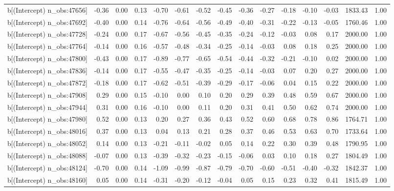 \begin{table}[ht]
\begin{tabular}{rrrrrrrrrrrrrrr}
  b[(Intercept) n\_obs:47656] & -0.36 & 0.00 & 0.13 & -0.70 & -0.61 & -0.52 & -0.45 & -0.36 & -0.27 & -0.18 & -0.10 & -0.03 & 1833.43 & 1.00 \\ 
  b[(Intercept) n\_obs:47692] & -0.40 & 0.00 & 0.14 & -0.76 & -0.64 & -0.56 & -0.49 & -0.40 & -0.31 & -0.22 & -0.13 & -0.05 & 1760.46 & 1.00 \\ 
  b[(Intercept) n\_obs:47728] & -0.24 & 0.00 & 0.17 & -0.67 & -0.56 & -0.45 & -0.35 & -0.24 & -0.12 & -0.03 & 0.08 & 0.17 & 2000.00 & 1.00 \\ 
  b[(Intercept) n\_obs:47764] & -0.14 & 0.00 & 0.16 & -0.57 & -0.48 & -0.34 & -0.25 & -0.14 & -0.03 & 0.08 & 0.18 & 0.25 & 2000.00 & 1.00 \\ 
  b[(Intercept) n\_obs:47800] & -0.43 & 0.00 & 0.17 & -0.89 & -0.77 & -0.65 & -0.54 & -0.44 & -0.32 & -0.21 & -0.10 & 0.02 & 2000.00 & 1.00 \\ 
  b[(Intercept) n\_obs:47836] & -0.14 & 0.00 & 0.17 & -0.55 & -0.47 & -0.35 & -0.25 & -0.14 & -0.03 & 0.07 & 0.20 & 0.27 & 2000.00 & 1.00 \\ 
  b[(Intercept) n\_obs:47872] & -0.18 & 0.00 & 0.17 & -0.62 & -0.51 & -0.39 & -0.29 & -0.17 & -0.06 & 0.04 & 0.15 & 0.22 & 2000.00 & 1.00 \\ 
  b[(Intercept) n\_obs:47908] & 0.29 & 0.00 & 0.15 & -0.10 & 0.00 & 0.10 & 0.20 & 0.29 & 0.39 & 0.48 & 0.59 & 0.67 & 2000.00 & 1.00 \\ 
  b[(Intercept) n\_obs:47944] & 0.31 & 0.00 & 0.16 & -0.10 & 0.00 & 0.11 & 0.20 & 0.31 & 0.41 & 0.50 & 0.62 & 0.74 & 2000.00 & 1.00 \\ 
  b[(Intercept) n\_obs:47980] & 0.52 & 0.00 & 0.13 & 0.20 & 0.27 & 0.36 & 0.43 & 0.52 & 0.60 & 0.68 & 0.78 & 0.86 & 1764.71 & 1.00 \\ 
  b[(Intercept) n\_obs:48016] & 0.37 & 0.00 & 0.13 & 0.04 & 0.13 & 0.21 & 0.28 & 0.37 & 0.46 & 0.53 & 0.63 & 0.70 & 1733.64 & 1.00 \\ 
  b[(Intercept) n\_obs:48052] & 0.14 & 0.00 & 0.13 & -0.21 & -0.11 & -0.02 & 0.05 & 0.14 & 0.22 & 0.30 & 0.39 & 0.48 & 1790.95 & 1.00 \\ 
  b[(Intercept) n\_obs:48088] & -0.07 & 0.00 & 0.13 & -0.39 & -0.32 & -0.23 & -0.15 & -0.06 & 0.03 & 0.10 & 0.18 & 0.27 & 1804.49 & 1.00 \\ 
  b[(Intercept) n\_obs:48124] & -0.70 & 0.00 & 0.14 & -1.09 & -0.99 & -0.87 & -0.79 & -0.70 & -0.60 & -0.51 & -0.40 & -0.32 & 1842.37 & 1.00 \\ 
  b[(Intercept) n\_obs:48160] & 0.05 & 0.00 & 0.14 & -0.31 & -0.20 & -0.12 & -0.04 & 0.05 & 0.15 & 0.23 & 0.32 & 0.41 & 1815.49 & 1.00 \\ 

\end{tabular}
\end{table}
